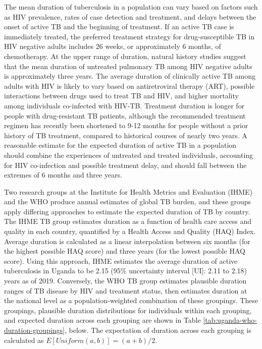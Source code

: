\documentclass[
]{report}
\begin{document}
The mean duration of tuberculosis in a population can vary based on factors such as HIV prevalence, rates of case detection and treatment, and delays between the onset of active TB and the beginning of treatment. If an active TB case is immediately treated, the preferred treatment strategy for drug-susceptible TB in HIV negative adults includes 26 weeks, or approximately 6 months, of chemotherapy.\autocite{WorldHealthOrganization2017} At the upper range of duration, natural history studies suggest that the mean duration of untreated pulmonary TB among HIV negative adults is approximately three years.\autocite{Tiemersma2011} The average duration of clinically active TB among adults with HIV is likely to vary based on antiretroviral therapy (ART), possible interactions between drugs used to treat TB and HIV, and higher mortality among individuals co-infected with HIV-TB.\autocite{Payne2007,Tiemersma2011} Treatment duration is longer for people with drug-resistant TB patients, although the recommended treatment regimen has recently been shortened to 9-12 months for people without a prior history of TB treatment, compared to historical courses of nearly two years.\autocite{WorldHealthOrganization2020b,Falzon2011} A reasonable estimate for the expected duration of active TB in a population should combine the experiences of untreated and treated individuals, accounting for HIV co-infection and possible treatment delay, and should fall between the extremes of 6 months and three years.

Two research groups at the Institute for Health Metrics and Evaluation (IHME) and the WHO produce annual estimates of global TB burden,\autocite{Ledesma2021,WorldHealthOrganization2020a} and these groups apply differing approaches to estimate the expected duration of TB by country. The IHME TB group estimates duration as a function of health care access and quality in each country, quantified by a Health Access and Quality (HAQ) Index.\autocite{Fullman2018} Average duration is calculated as a linear interpolation between six months (for the highest possible HAQ score) and three years (for the lowest possible HAQ score). Using this approach, IHME estimates the average duration of active tuberculosis in Uganda to be 2.15 (95\% uncertainty interval {[}UI{]}: 2.11 to 2.18) years as of 2019.\autocite{Ledesma2021} Conversely, the WHO TB group estimates plausible duration ranges of TB disease by HIV and treatment status, then estimates duration at the national level as a population-weighted combination of these groupings.\autocite{Glaziou2020} These groupings, plausible duration distributions for individuals within each grouping, and expected duration across each grouping are shown in Table \ref{tab:uganda-who-duration-groupings}, below. The expectation of duration across each grouping is calculated as \(E[Uniform(a, b)] = (a+b)/2\).
\end{document}
